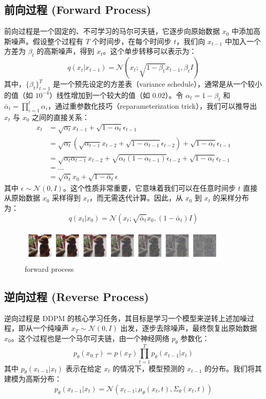 \documentclass{ctexart}
\begin{document}
\subsection{前向过程 (Forward Process)}
\noindent
前向过程是一个固定的、不可学习的马尔可夫链，它逐步向原始数据 $x_0$ 中添加高斯噪声。假设整个过程有 $T$ 个时间步，在每个时间步 $t$，我们向 $x_{t-1}$ 中加入一个方差为 $\beta_t$ 的高斯噪声，得到 $x_t$。这个单步转移可以表示为：
$$ q(x_t | x_{t-1}) = \mathcal{N}(x_t; \sqrt{1 - \beta_t} x_{t-1}, \beta_t I) $$
其中，$\{\beta_t\}_{t=1}^T$ 是一个预先设定的方差表（variance schedule），通常是从一个较小的值（如 $10^{-4}$）线性增加到一个较大的值（如 $0.02$）。令 $\alpha_t = 1 - \beta_t$ 和 $\bar{\alpha}_t = \prod_{i=1}^{t} \alpha_i$，通过重参数化技巧（reparameterization trick），我们可以推导出 $x_t$ 与 $x_0$ 之间的直接关系：
\begin{align*}
    x_t &= \sqrt{\alpha_t}x_{t-1} + \sqrt{1-\alpha_t}\epsilon_{t-1} \\
    &= \sqrt{\alpha_t}(\sqrt{\alpha_{t-1}}x_{t-2} + \sqrt{1-\alpha_{t-1}}\epsilon_{t-2}) + \sqrt{1-\alpha_t}\epsilon_{t-1} \\
    &= \sqrt{\alpha_t\alpha_{t-1}}x_{t-2} + \sqrt{\alpha_t(1-\alpha_{t-1})}\epsilon_{t-2} + \sqrt{1-\alpha_t}\epsilon_{t-1} \\
    &= \dots \\
    &= \sqrt{\bar{\alpha}_t}x_0 + \sqrt{1 - \bar{\alpha}_t}\epsilon
\end{align*}
其中 $\epsilon \sim \mathcal{N}(0, I)$。这个性质非常重要，它意味着我们可以在任意时间步 $t$ 直接从原始数据 $x_0$ 采样得到 $x_t$，而无需迭代计算。因此，从 $x_0$ 到 $x_t$ 的采样分布为：
$$ q(x_t | x_0) = \mathcal{N}(x_t; \sqrt{\bar{\alpha}_t} x_0, (1 - \bar{\alpha}_t) I) $$

 \begin{figure}[htb]
    \centering
    \includegraphics[width=0.9\textwidth]{forward.png}
    \caption{forward process}
    \label{fig:forward}
 \end{figure}

\subsection{逆向过程 (Reverse Process)}
\noindent
逆向过程是 DDPM 的核心学习任务，其目标是学习一个模型来逆转上述加噪过程，即从一个纯噪声 $x_T \sim \mathcal{N}(0, I)$ 出发，逐步去除噪声，最终恢复出原始数据 $x_0$。这个过程也是一个马尔可夫链，由一个神经网络 $p_\theta$ 参数化：
$$ p_\theta(x_{0:T}) = p(x_T) \prod_{t=1}^T p_\theta(x_{t-1} | x_t) $$
其中 $p_\theta(x_{t-1} | x_t)$ 表示在给定 $x_t$ 的情况下，模型预测的 $x_{t-1}$ 的分布。我们将其建模为高斯分布：
$$ p_\theta(x_{t-1} | x_t) = \mathcal{N}(x_{t-1}; \mu_\theta(x_t, t), \Sigma_\theta(x_t, t)) $$
\end{document}
